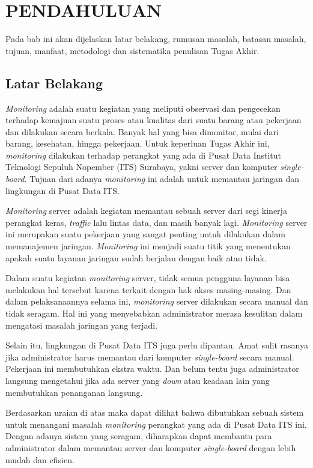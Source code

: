 \chapter{PENDAHULUAN}
Pada bab ini akan dijelaskan latar belakang, rumusan masalah, batasan masalah, tujuan, manfaat, metodologi dan sistematika penulisan Tugas Akhir.

\section{Latar Belakang}
\textit{Monitoring} adalah suatu kegiatan yang meliputi observasi dan pengecekan terhadap kemajuan suatu proses atau kualitas dari suatu barang atau pekerjaan dan dilakukan secara berkala. Banyak hal yang bisa dimonitor, mulai dari barang, kesehatan, hingga pekerjaan. Untuk keperluan Tugas Akhir ini, \textit{monitoring} dilakukan terhadap perangkat yang ada di Pusat Data Institut Teknologi Sepuluh Nopember (ITS) Surabaya, yakni server dan komputer \textit{single-board}. Tujuan dari adanya \textit{monitoring} ini adalah untuk memantau jaringan dan lingkungan di Pusat Data ITS.

\textit{Monitoring} server adalah kegiatan memantau sebuah server dari segi kinerja perangkat keras, \textit{traffic} lalu lintas data, dan masih banyak lagi. \textit{Monitoring} server ini merupakan suatu pekerjaan yang sangat penting untuk dilakukan dalam memanajemen jaringan. \textit{Monitoring} ini menjadi suatu titik yang menentukan apakah suatu layanan jaringan sudah berjalan dengan baik atau tidak.

Dalam suatu kegiatan \textit{monitoring} server, tidak semua pengguna layanan bisa melakukan hal tersebut karena terkait dengan hak akses masing-masing. Dan dalam pelaksanaannya selama ini, \textit{monitoring} server dilakukan secara manual dan tidak seragam. Hal ini yang menyebabkan administrator merasa kesulitan dalam mengatasi masalah jaringan yang terjadi.

Selain itu, lingkungan di Pusat Data ITS juga perlu dipantau. Amat sulit rasanya jika administrator harus memantau dari komputer \textit{single-board} secara manual. Pekerjaan ini membutuhkan ekstra waktu. Dan belum tentu juga administrator langsung mengetahui jika ada server yang \textit{down} atau keadaan lain yang membutuhkan penanganan langsung.

Berdasarkan uraian di atas maka dapat dilihat bahwa dibutuhkan sebuah sistem untuk menangani masalah \textit{monitoring} perangkat yang ada di Pusat Data ITS ini. Dengan adanya sistem yang seragam, diharapkan dapat membantu para administrator dalam memantau server dan komputer \textit{single-board} dengan lebih mudah dan efisien.


